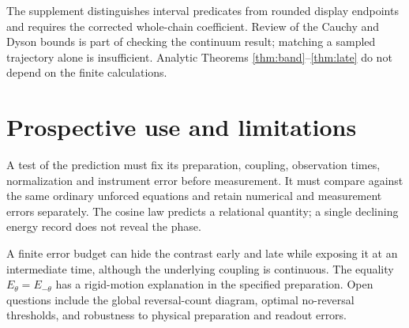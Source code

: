 \documentclass[11pt]{article}
\begin{document}
The supplement distinguishes interval predicates from rounded display
endpoints and requires the corrected whole-chain coefficient. Review of
the Cauchy and Dyson bounds is part of checking the continuum result;
matching a sampled trajectory alone is insufficient. Analytic Theorems
\ref{thm:band}--\ref{thm:late} do not depend on the finite calculations.

\section{Prospective use and limitations}
A test of the prediction must fix its preparation, coupling, observation
times, normalization and instrument error before measurement. It must
compare against the same ordinary unforced equations and retain numerical
and measurement errors separately. The cosine law predicts a relational
quantity; a single declining energy record does not reveal the phase.

A finite error budget can hide the contrast early and late while exposing
it at an intermediate time, although the underlying coupling is continuous.
The equality $E_\theta=E_{-\theta}$ has a rigid-motion explanation in the
specified preparation.
Open questions include the global reversal-count diagram, optimal
no-reversal thresholds, and robustness to physical preparation and readout
errors.
\end{document}
